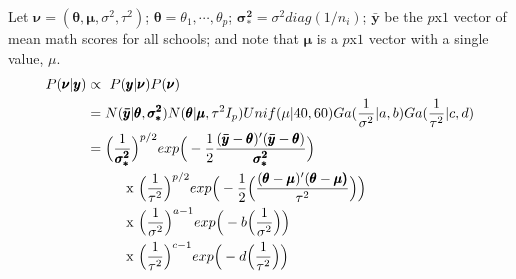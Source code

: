 \documentclass[12pt,letterpaper]{article}\usepackage[]{graphicx}\usepackage[]{color}
\begin{document}
Let $\pmb{\nu} = (\pmb{\theta}, \pmb{\mu}, \sigma^2, \tau^2)$; 
$\pmb{\theta}=\theta_1,\cdots,\theta_p$; 
$\pmb{\sigma_{*}^{2}} = \sigma^2 diag(1/n_i)$;
$\pmb{\bar{y}}$ be the $p$x$1$ vector
of mean math scores for all schools;
and note that $\pmb{\mu}$ is a $p$x$1$
vector with a single value, $\mu$.
\begin{align*}
  P(\pmb{\nu}|\pmb{y}) &\propto\ P(\pmb{y}|\pmb{\nu})P(\pmb{\nu})\\
  &= N(\pmb{\bar{y}}|\pmb{\theta},\pmb{\sigma_{*}^{2}})
    N(\pmb{\theta}|\pmb{\mu}, \tau^2 I_p)
    Unif(\mu|40,60)
  	Ga(\dfrac{1}{\sigma^2}|a, b) Ga(\dfrac{1}{\tau^2}|c, d)\\
  &= \Big( \frac{1}{\pmb{\sigma_{*}^{2}}} \Big) ^{p/2}
    exp \Big( -\frac{1}{2} \frac{(\pmb{\bar{y}}-\pmb{\theta})'
    (\pmb{\bar{y}}-\pmb{\theta})}{\pmb{\sigma_{*}^{2}}} \Big)\\
    &\hspace{10mm} \text{x } \Big( \dfrac{1}{\tau^2} \Big) ^{p/2}
			exp \Big( -\frac{1}{2} \Big( \dfrac{(\pmb{\theta}-\pmb{\mu})'
        (\pmb{\theta}-\pmb{\mu)}} {\tau^2} \Big)\Big)\\
		& \hspace{10mm} \text{x } \Big( \dfrac{1}{\sigma^2} \Big) 
			^{a-1} exp \Big( -b \Big( \dfrac{1}{\sigma^2} \Big) \Big)\\
		& \hspace{10mm} \text{x } \Big( \dfrac{1}{\tau^2} \Big) 
			^{c-1} exp \Big( -d \Big( \dfrac{1}{\tau^2} \Big) \Big)\\
\end{align*}
\end{document}

